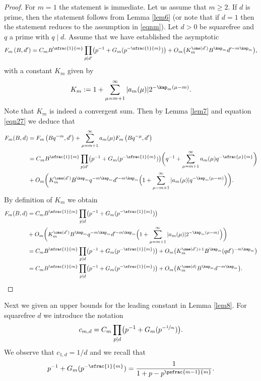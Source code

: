 \begin{proof}
For $m=1$ the statement is immediate. Let us assume that $m\geq 2$.
If $d$ is prime, then the statement follows from Lemma \ref{lem6} (or note that if $d=1$ then the statement reduces to the assumption in \eqref{eqnm}). Let $d>0$ be squarefree and $q$ a prime with $q\mid d$. Assume that we have established the asymptotic
\[
F_m\left(B,d'\right)=C_mB^{\sfrac{1}{m}}\prod_{p\mid d'} \bigl(p^{-1}+G_m(p^{-\sfrac{1}{m}})\bigr)+ O_m\bigl(K_m^{\ome(d')}B^{\kap_m}d'^{-m\kap_m}\bigr),
\]
with a constant $K_m$ given by
\[
K_m:= 1+\sum_{\mu=m+1}^{\infty}|a_m(\mu)| 2^{-\kap_m(\mu-m)}.
\]
Note that $K_m$ is indeed a convergent sum. Then by Lemma \ref{lem7} and equation \eqref{eqn27} we deduce that
\begin{equation*}
\begin{split}
F_m(B,d)&= F_m\left(Bq^{-m},d'\right) +\sum_{\mu=m+1}^\infty a_m(\mu) F_m\left(Bq^{-\mu},d'\right)\\
&=C_mB^{\sfrac{1}{m}}\prod_{p\mid d'} \bigl(p^{-1}+G_m(p^{-\sfrac{1}{m}})\bigl)\biggl(q^{-1}+\sum_{\mu=m+1}^\infty a_m(\mu) q^{-\sfrac{\mu}{m}}\biggr)\\
&+ O_m\biggl(K_m^{\ome(d')}B^{\kap_m}q^{-m\kap_m}d'^{-m\kap_m}\Bigl(1+\sum_{\mu=m+1}^{\infty}|a_m(\mu)| q^{-\kap_m(\mu-m)}\Bigr)\biggr).
\end{split}
\end{equation*}
By definition of $K_m$ we obtain
\begin{equation*}
\begin{split}
F_m(B,d)&=C_mB^{\sfrac{1}{m}}\prod_{p\mid d} \bigl(p^{-1}+G_m(p^{-\sfrac{1}{m}})\bigr)\\ &+ O_m\biggl(K_m^{\ome(d')}B^{\kap_m}q^{-m\kap_m}d'^{-m\kap_m}\Bigl(1+\sum_{\mu=m+1}^{\infty}|a_m(\mu)| 2^{-\kap_m(\mu-m)}\Bigr)\biggr)\\
&=C_mB^{\sfrac{1}{m}}\prod_{p\mid d} \bigl(p^{-1}+G_m(p^{-\sfrac{1}{m}})\bigr)+ O_m\bigl(K_m^{\ome(d')+1}B^{\kap_m}(qd')^{-m\kap_m}\bigr)\\
&= C_mB^{\sfrac{1}{m}}\prod_{p\mid d} \bigl(p^{-1}+G_m(p^{-\sfrac{1}{m}})\bigr)+ O_m\bigl(K_m^{\ome(d)}B^{\kap_m}d^{-m\kap_m}\bigr).
\qedhere
\end{split}
\end{equation*}
\end{proof}

Next we given an upper bounds for the leading constant in Lemma \ref{lem8}. For squarefree $d$ we introduce the notation
\begin{equation}
\label{eq:c_md_explicit}
c_{m,d}=C_m\prod_{p\mid d}\bigl(p^{-1}+G_m(p^{-\sfrac{1}{m}})\bigr).
\end{equation}
We observe that $c_{1,d}=1/d$ and we recall that
\begin{equation}\label{eqn10}
p^{-1}+G_{m}(p^{-\sfrac{1}{m}})=\frac1{1+p-p^{\psfrac{m-1}{m}}}.
\end{equation}

